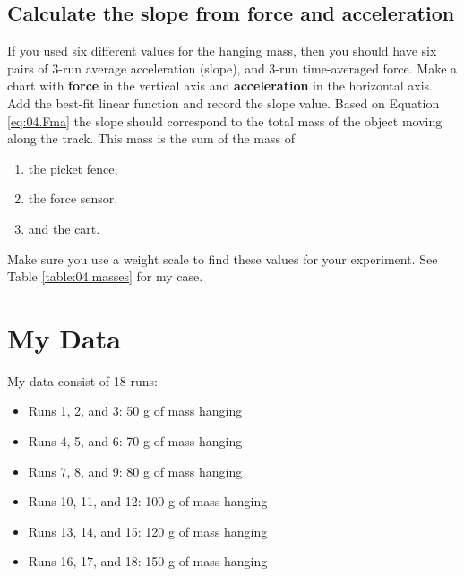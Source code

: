 \subsection{Calculate the slope from force and acceleration}
%
If you used six different values for the hanging mass, then you should have six pairs of 3-run average acceleration (slope), and 3-run time-averaged force. Make a chart with \textbf{force} in the vertical axis and \textbf{acceleration} in the horizontal axis. Add the best-fit linear function and record the slope value. Based on Equation \ref{eq:04.Fma} the slope should correspond to the total mass of the object moving along the track. This mass is the sum of the mass of
\begin{enumerate}
    \item the picket fence,
    \item the force sensor,
    \item and the cart.
\end{enumerate}
Make sure you use a weight scale to find these values for your experiment. See Table \ref{table:04.masses} for my case.
%
\section{My Data}
%
My data consist of 18 runs:
\begin{itemize}
    \item Runs 1, 2, and 3: 50 g of mass hanging
    \item Runs 4, 5, and 6: 70 g of mass hanging
    \item Runs 7, 8, and 9: 80 g of mass hanging
    \item Runs 10, 11, and 12: 100 g of mass hanging
    \item Runs 13, 14, and 15: 120 g of mass hanging
    \item Runs 16, 17, and 18: 150 g of mass hanging
\end{itemize}
%
